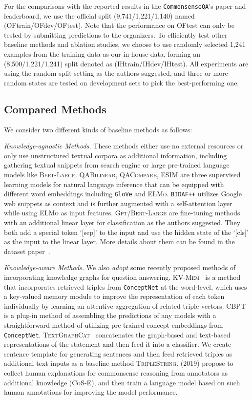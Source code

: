 \documentclass[11pt,a4paper]{article}
\begin{document}
For the comparisons with the reported results in the \texttt{CommonsenseQA}'s paper and leaderboard, 
we use the official split (9,741/1,221/1,140) named (OFtrain/OFdev/OFtest).
Note that 
the performance on OFtest can only be tested
by submitting predictions to the organizers.
To efficiently test other baseline methods and ablation studies, 
we choose to use randomly selected 1,241 examples from the training data as our in-house data, 
forming an (8,500/1,221/1,241) split denoted as (IHtrain/IHdev/IHtest).
All experiments are using the random-split setting as the authors suggested, and three or more random states are tested on development sets to pick the best-performing one.

\subsection{Compared Methods}
We consider two different kinds of baseline methods as follows:

\smallskip
\noindent
 \textit{Knowledge-agnostic Methods.} 
These methods either use no external resources or only use unstructured textual corpora as additional information, including gathering textual snippets from search engine or large pre-trained language models like \textsc{Bert-Large}. 
\textsc{QABilinear}, \textsc{QACompare}, \textsc{ESIM} are three supervised learning models for natural language inference that can be equipped with different word embeddings including \texttt{GloVe} and \textsc{ELMo}.
\texttt{BIDAF++} utilizes Google web snippets as context 
and is further
augmented with a self-attention layer 
while using \textsc{ELMo} as input features.
\textsc{Gpt}/\textsc{Bert-Large} are fine-tuning methods with an additional linear layer for classification as the authors suggested. 
They both add a special token `[sep]' to
the input and use the hidden state of the `[cls]' as the input to the linear layer.
More details about them can be found in the dataset paper~\cite{Talmor2018CommonsenseQAAQ}.

\smallskip
\noindent
 \textit{Knowledge-aware Methods.}  
We also \textit{adopt} some recently proposed methods of incorporating knowledge graphs for question answering.
\textsc{KV-Mem}~\cite{Mihaylov2018KnowledgeableRE} is a method that incorporates retrieved triples from \texttt{ConceptNet} at the word-level, which uses a key-valued memory module to improve the representation of each token individually by learning an attentive aggregation of related triple vectors.
\textsc{CBPT}~\cite{Zhong2018ImprovingQA} is a plug-in method of assembling the predictions of any models with a straightforward method of utilizing pre-trained concept embeddings from \texttt{ConceptNet}.
\textsc{TextGraphCat}~\cite{Wang2018ImprovingNL} concatenates the graph-based and  text-based representations of the statement and then feed it into a classifier. 
We create sentence template for generating sentences and then feed retrieved triples as additional text inputs as a baseline method \textsc{TripleString}. 
\citeauthor{Rajani2019ExplainYL} (2019) propose to collect human explanations for commonsense reasoning from annotators as additional knowledge (\textsc{CoS-E}), and then train a language model based on such human annotations for improving the model performance.  
\end{document}
